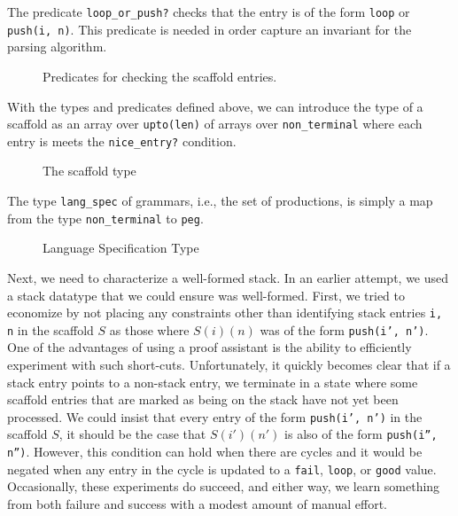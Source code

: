 \documentclass[sigplan,10pt,anonymous,review]{acmart}\settopmatter{printfolios=true,printccs=false,printacmref=false}
\begin{document}
\begin{CCSXML}
The predicate \texttt{loop\_or\_push?} checks that the entry is of the form
\texttt{loop} or \texttt{push(i, n)}\@.  This predicate is needed 
in order capture an invariant for the parsing algorithm.

\begin{figure}[h!]
			
			\caption{Predicates for checking the scaffold entries.}
			\label{pvs:checkentry}
\end{figure}



With the types and predicates defined above, we can introduce the type of a
scaffold as an array over \texttt{upto(len)} of arrays over \texttt{non\_terminal}
where each entry is meets the \texttt{nice\_entry?} condition\@.  
\begin{figure}[h!]
			
			\caption{The scaffold type}
			\label{pvs:scaffold}
\end{figure}

The type \texttt{lang\_spec} of grammars, i.e., the set of productions, is
simply a map from the type \texttt{non\_terminal} to \texttt{peg}\@.  
\begin{figure}[h!]
			
			\caption{Language Specification Type}
			\label{pvs:grammar}
\end{figure}

Next, we need to characterize a well-formed stack.  In an earlier
attempt, we used a stack datatype that we could ensure was
well-formed.  First, we tried to economize by not placing any
constraints other than identifying stack entries \texttt{i, n} in the
scaffold $S$ as those where $S(i)(n)$ was of the form \texttt{push(i',
  n')}\@.  One of the advantages of using a proof assistant is the
ability to efficiently experiment with such short-cuts.
Unfortunately, it quickly becomes clear that if a stack entry points
to a non-stack entry, we terminate in a state where some scaffold
entries that are marked as being on the stack have not yet been
processed.  We could insist that every entry of the form
\texttt{push(i', n')} in the scaffold $S$, it should be the case that
$S(i')(n')$ is also of the form \texttt{push(i'', n'')}.  However,
this condition can hold when there are cycles and it would be negated
when any entry in the cycle is updated to a \texttt{fail},
\texttt{loop}, or \texttt{good} value.  Occasionally, these
experiments do succeed, and either way, we learn something from both
failure and success with a modest amount of manual effort.


\end{CCSXML}
\end{document}
